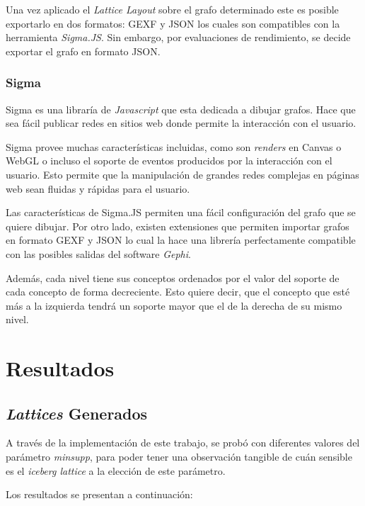 \documentclass[12pt,oneside,letterpaper]{book}
\newcommand{\eng}[1]{\textit{#1}\xspace}			%
\newcommand{\abr}[1]{\textsc{#1}\xspace}           %
\theoremstyle{definition}
\begin{document}
Una vez aplicado el \eng{Lattice Layout} sobre el grafo determinado este es posible exportarlo en dos formatos: \abr{GEXF} y \abr{JSON} los cuales son compatibles con la herramienta \eng{Sigma.JS}. Sin embargo, por evaluaciones de rendimiento, se decide exportar el grafo en formato \abr{JSON}.

\subsection{Sigma}
\label{sub:exporter_to_sigma}
Sigma es una libraría de \eng{Javascript} que esta dedicada a dibujar grafos. Hace que sea fácil publicar redes en sitios web donde permite la interacción con el usuario.

Sigma provee muchas características incluidas, como son \eng{renders} en Canvas o WebGL o incluso el soporte de eventos producidos por la interacción con el usuario. Esto permite que la manipulación de grandes redes complejas en páginas web sean fluidas y rápidas para el usuario.

Las características de Sigma.JS permiten una fácil configuración del grafo que se quiere dibujar. Por otro lado, existen extensiones que permiten importar grafos en formato \abr{GEXF} y \abr{JSON} lo cual la hace una librería perfectamente compatible con las posibles salidas del software \eng{Gephi}.

Además, cada nivel tiene sus conceptos ordenados por el valor del soporte de cada concepto de forma decreciente. Esto quiere decir, que el concepto que esté más a la izquierda tendrá un soporte mayor que el de la derecha de su mismo nivel.


\chapter{Resultados}
\section{\eng{Lattices} Generados}
A través de la implementación de este trabajo, se probó con diferentes valores del parámetro \eng{minsupp}, para poder tener una observación tangible de cuán sensible es el \eng{iceberg lattice} a la elección de este parámetro.

Los resultados se presentan a continuación:
\end{document}
